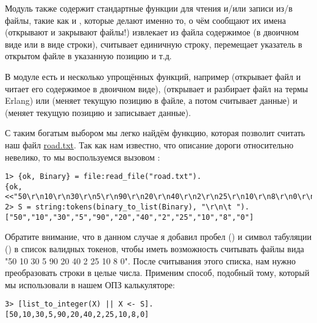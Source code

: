 Модуль также содержит стандартные функции для чтения и/или записи из/в файлы, такие как  и , которые делают именно то, о чём сообщают их имена (открывают и закрывают файлы!)
 извлекает из файла содержимое (в двоичном виде или в виде строки),  считывает единичную строку,  перемещает указатель в открытом файле в указанную позицию и т.д.

В модуле есть и несколько упрощённых функций, например  (открывает файл и читает его содержимое в двоичном виде),  (открывает и разбирает файл на термы Erlang) или  (меняет текущую позицию в файле, а потом считывает данные) и  (меняет текущую позицию и записывает данные).

С таким богатым выбором мы легко найдём функцию, которая позволит считать наш файл \href{http://learnyousomeerlang.com/static/erlang/road.txt}{road.txt}.
Так как нам известно, что описание дороги относительно невелико, то мы воспользуемся вызовом :
\begin{lstlisting}[style=erlang]
1> {ok, Binary} = file:read_file("road.txt").
{ok,<<"50\r\n10\r\n30\r\n5\r\n90\r\n20\r\n40\r\n2\r\n25\r\n10\r\n8\r\n0\r\n">>}
2> S = string:tokens(binary_to_list(Binary), "\r\n\t ").
["50","10","30","5","90","20","40","2","25","10","8","0"]
\end{lstlisting}

Обратите внимание, что в данном случае я добавил пробел () и символ табуляции () в список валидных токенов, чтобы иметь возможность считывать файлы вида "50 10 30 5 90 20 40 2 25 10 8 0".
После считывания этого списка, нам нужно преобразовать строки в целые числа.
Применим способ, подобный тому, который мы использовали в нашем ОПЗ калькуляторе:
\begin{lstlisting}[style=erlang]
3> [list_to_integer(X) || X <- S].
[50,10,30,5,90,20,40,2,25,10,8,0]
\end{lstlisting}

